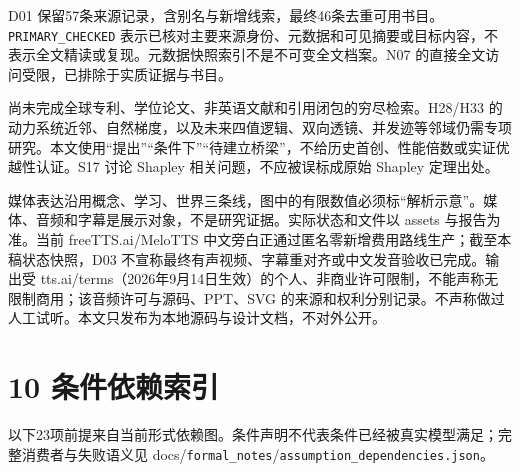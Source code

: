 \documentclass[
  10pt,
]{article}
\begin{document}
D01
保留57条来源记录，含别名与新增线索，最终46条去重可用书目。\nolinkurl{PRIMARY_CHECKED}
表示已核对主要来源身份、元数据和可见摘要或目标内容，不表示全文精读或复现。元数据快照索引不是不可变全文档案。N07
的直接全文访问受限，已排除于实质证据与书目。

尚未完成全球专利、学位论文、非英语文献和引用闭包的穷尽检索。H28/H33
的动力系统近邻、自然梯度，以及未来四值逻辑、双向透镜、并发迹等邻域仍需专项研究。本文使用``提出''``条件下''``待建立桥梁''，不给历史首创、性能倍数或实证优越性认证。S17
讨论 Shapley 相关问题，不应被误标成原始 Shapley 定理出处。

媒体表达沿用概念、学习、世界三条线，图中的有限数值必须标``解析示意''。媒体、音频和字幕是展示对象，不是研究证据。实际状态和文件以
assets 与报告为准。当前 freeTTS.ai/MeloTTS
中文旁白正通过匿名零新增费用路线生产；截至本稿状态快照，D03
不宣称最终有声视频、字幕重对齐或中文发音验收已完成。输出受
tts.ai/terms（2026年9月14日生效）的个人、非商业许可限制，不能声称无限制商用；该音频许可与源码、PPT、SVG
的来源和权利分别记录。不声称做过人工试听。本文只发布为本地源码与设计文档，不对外公开。

\section{10 条件依赖索引}\label{ux6761ux4ef6ux4f9dux8d56ux7d22ux5f15}

以下23项前提来自当前形式依赖图。条件声明不代表条件已经被真实模型满足；完整消费者与失败语义见
docs/\nolinkurl{formal_notes}/\nolinkurl{assumption_dependencies.json}。
\end{document}
